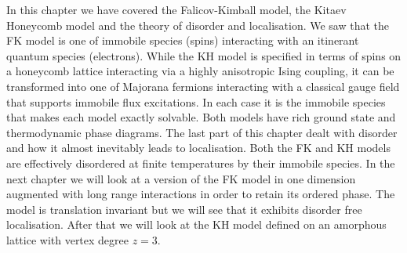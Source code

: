 In this chapter we have covered the Falicov-Kimball model, the Kitaev Honeycomb model and the theory of disorder and localisation. We saw that the FK model is one of immobile species (spins) interacting with an itinerant quantum species (electrons). While the KH model is specified in terms of spins on a honeycomb lattice interacting via a highly anisotropic Ising coupling, it can be transformed into one of Majorana fermions interacting with a classical gauge field that supports immobile flux excitations. In each case it is the immobile species that makes each model exactly solvable. Both models have rich ground state and thermodynamic phase diagrams. The last part of this chapter dealt with disorder and how it almost inevitably leads to localisation. Both the FK and KH models are effectively disordered at finite temperatures by their immobile species. In the next chapter we will look at a version of the FK model in one dimension augmented with long range interactions in order to retain its ordered phase. The model is translation invariant but we will see that it exhibits disorder free localisation. After that we will look at the KH model defined on an amorphous lattice with vertex degree \(z=3\).
